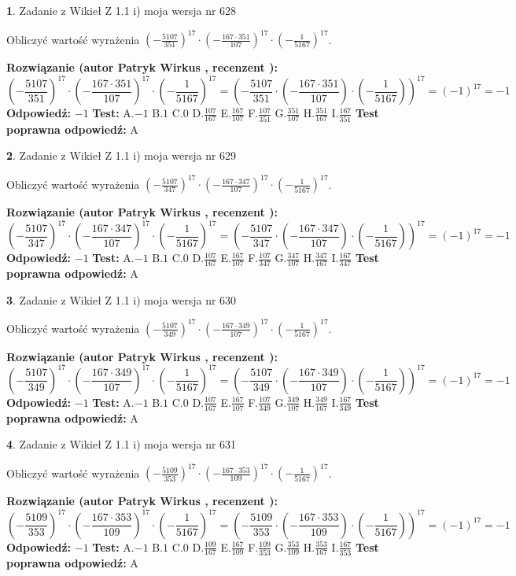 \documentclass[12pt, a4paper]{article}
\theoremstyle{definition} %
\newtheorem{zad}{}
\newcommand{\zadStart}[1]{\begin{zad}#1\newline}
\newcommand{\zadStop}{\end{zad}}
\newcommand{\rozwStart}[2]{\noindent \textbf{Rozwiązanie (autor #1 , recenzent #2): }\newline}
\newcommand{\rozwStop}{\newline}
\newcommand{\odpStart}{\noindent \textbf{Odpowiedź:}\newline}
\newcommand{\odpStop}{\newline}
\newcommand{\testStart}{\noindent \textbf{Test:}\newline}
\newcommand{\testStop}{\newline}
\newcommand{\kluczStart}{\noindent \textbf{Test poprawna odpowiedź:}\newline}
\newcommand{\kluczStop}{\newline}
\begin{document}
\zadStart{Zadanie z Wikieł Z 1.1 i) moja wersja nr 628}

Obliczyć wartość wyrażenia $(-\frac{5107}{351})^{17} \cdot (-\frac{167 \cdot 351}{107})^{17} \cdot (-\frac{1}{5167})^{17}$.
\zadStop
\rozwStart{Patryk Wirkus}{}
$$(-\frac{5107}{351})^{17} \cdot (-\frac{167 \cdot 351}{107})^{17} \cdot (-\frac{1}{5167})^{17} = (-\frac{5107}{351} \cdot (-\frac{167 \cdot 351}{107}) \cdot (-\frac{1}{5167}))^{17} = (-1)^{17} = -1$$
\rozwStop
\odpStart
$-1$
\odpStop
\testStart
A.$-1$ B.$1$ C.$0$ D.$\frac{107}{167}$ E.$\frac{167}{107}$
F.$\frac{107}{351}$ G.$\frac{351}{107}$
H.$\frac{351}{167}$
I.$\frac{167}{351}$
\testStop
\kluczStart
A
\kluczStop



\zadStart{Zadanie z Wikieł Z 1.1 i) moja wersja nr 629}

Obliczyć wartość wyrażenia $(-\frac{5107}{347})^{17} \cdot (-\frac{167 \cdot 347}{107})^{17} \cdot (-\frac{1}{5167})^{17}$.
\zadStop
\rozwStart{Patryk Wirkus}{}
$$(-\frac{5107}{347})^{17} \cdot (-\frac{167 \cdot 347}{107})^{17} \cdot (-\frac{1}{5167})^{17} = (-\frac{5107}{347} \cdot (-\frac{167 \cdot 347}{107}) \cdot (-\frac{1}{5167}))^{17} = (-1)^{17} = -1$$
\rozwStop
\odpStart
$-1$
\odpStop
\testStart
A.$-1$ B.$1$ C.$0$ D.$\frac{107}{167}$ E.$\frac{167}{107}$
F.$\frac{107}{347}$ G.$\frac{347}{107}$
H.$\frac{347}{167}$
I.$\frac{167}{347}$
\testStop
\kluczStart
A
\kluczStop



\zadStart{Zadanie z Wikieł Z 1.1 i) moja wersja nr 630}

Obliczyć wartość wyrażenia $(-\frac{5107}{349})^{17} \cdot (-\frac{167 \cdot 349}{107})^{17} \cdot (-\frac{1}{5167})^{17}$.
\zadStop
\rozwStart{Patryk Wirkus}{}
$$(-\frac{5107}{349})^{17} \cdot (-\frac{167 \cdot 349}{107})^{17} \cdot (-\frac{1}{5167})^{17} = (-\frac{5107}{349} \cdot (-\frac{167 \cdot 349}{107}) \cdot (-\frac{1}{5167}))^{17} = (-1)^{17} = -1$$
\rozwStop
\odpStart
$-1$
\odpStop
\testStart
A.$-1$ B.$1$ C.$0$ D.$\frac{107}{167}$ E.$\frac{167}{107}$
F.$\frac{107}{349}$ G.$\frac{349}{107}$
H.$\frac{349}{167}$
I.$\frac{167}{349}$
\testStop
\kluczStart
A
\kluczStop



\zadStart{Zadanie z Wikieł Z 1.1 i) moja wersja nr 631}

Obliczyć wartość wyrażenia $(-\frac{5109}{353})^{17} \cdot (-\frac{167 \cdot 353}{109})^{17} \cdot (-\frac{1}{5167})^{17}$.
\zadStop
\rozwStart{Patryk Wirkus}{}
$$(-\frac{5109}{353})^{17} \cdot (-\frac{167 \cdot 353}{109})^{17} \cdot (-\frac{1}{5167})^{17} = (-\frac{5109}{353} \cdot (-\frac{167 \cdot 353}{109}) \cdot (-\frac{1}{5167}))^{17} = (-1)^{17} = -1$$
\rozwStop
\odpStart
$-1$
\odpStop
\testStart
A.$-1$ B.$1$ C.$0$ D.$\frac{109}{167}$ E.$\frac{167}{109}$
F.$\frac{109}{353}$ G.$\frac{353}{109}$
H.$\frac{353}{167}$
I.$\frac{167}{353}$
\testStop
\kluczStart
A
\kluczStop
\end{document}
